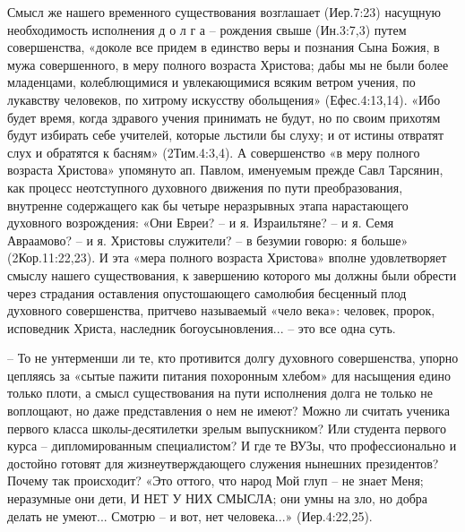 Смысл же нашего временного существования возглашает (Иер.7:23) насущную необходимость исполнения  д о л г а  – рождения свыше (Ин.3:7,3) путем совершенства, «доколе все придем в единство веры и познания Сына Божия, в мужа совершенного, в меру полного возраста Христова;  дабы мы не были более младенцами, колеблющимися и увлекающимися всяким ветром учения, по лукавству человеков, по хитрому искусству обольщения» (Ефес.4:13,14).  «Ибо будет время, когда здравого учения принимать не будут, но по своим прихотям будут избирать себе учителей, которые льстили бы слуху; и от истины отвратят слух и обратятся к басням» (2Тим.4:3,4).
    А совершенство «в меру полного возраста Христова» упомянуто ап. Павлом, именуемым прежде Савл Тарсянин, как процесс неотступного духовного движения по пути преобразования, внутренне содержащего как бы четыре неразрывных этапа нарастающего духовного возрождения: «Они Евреи? – и я. Израильтяне? – и я. Семя Авраамово? – и я. Христовы служители? – в безумии говорю: я больше» (2Кор.11:22,23).  И эта «мера полного возраста Христова» вполне удовлетворяет смыслу нашего существования, к завершению которого мы должны были обрести через страдания оставления опустошающего самолюбия бесценный плод духовного совершенства, притчево называемый «чело века»: человек, пророк, исповедник Христа, наследник богоусыновления... – это все одна суть.

 – То не унтерменши ли те, кто противится долгу духовного совершенства, упорно цепляясь за «сытые пажити питания похоронным хлебом» для насыщения едино только плоти, а смысл существования на пути исполнения долга не только не воплощают, но даже представления о нем не имеют?
Можно ли считать ученика первого класса школы-десятилетки зрелым выпускником? Или студента первого курса – дипломированным специалистом? И где те ВУЗы, что профессионально и достойно готовят для жизнеутверждающего служения нынешних президентов? Почему так происходит?
     «Это оттого, что народ Мой глуп – не знает Меня; неразумные они дети, И  НЕТ  У  НИХ  СМЫСЛА;  они умны на зло, но добра делать не умеют... Смотрю – и вот, нет человека...» (Иер.4:22,25).

